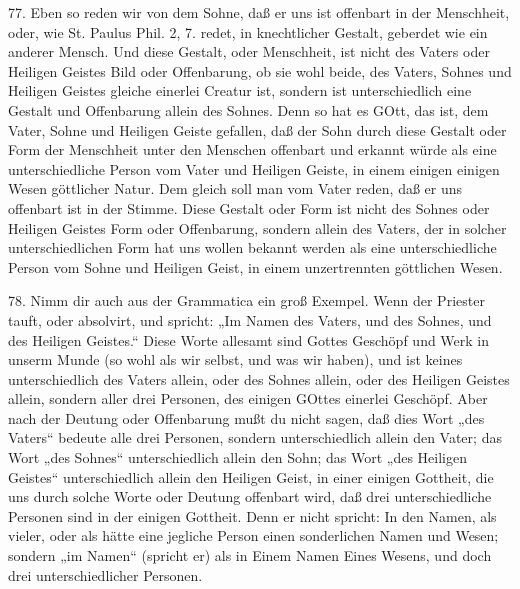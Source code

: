 77. Eben so reden wir von dem Sohne, daß er uns ist offenbart in der Menschheit, oder, wie St. Paulus Phil. 2, 7. redet, in knechtlicher Gestalt, geberdet wie ein anderer Mensch. Und diese Gestalt, oder Menschheit, ist nicht des Vaters oder Heiligen Geistes Bild oder Offenbarung, ob sie wohl beide, des Vaters, Sohnes und Heiligen Geistes gleiche einerlei Creatur ist, sondern ist unterschiedlich eine Gestalt und Offenbarung allein des Sohnes. Denn so hat es GOtt, das ist, dem Vater, Sohne und Heiligen Geiste gefallen, daß der Sohn durch diese Gestalt oder Form der Menschheit unter den Menschen offenbart und erkannt würde als eine unterschiedliche Person vom Vater und Heiligen Geiste, in einem einigen einigen Wesen göttlicher Natur. Dem gleich soll man vom Vater reden, daß er uns offenbart ist in der Stimme. Diese Gestalt oder Form ist nicht des Sohnes oder Heiligen Geistes Form oder Offenbarung, sondern allein des Vaters, der in solcher unterschiedlichen Form hat uns wollen bekannt werden als eine unterschiedliche Person vom Sohne und Heiligen Geist, in einem unzertrennten göttlichen Wesen.

78. Nimm dir auch aus der Grammatica ein groß Exempel. Wenn der Priester tauft, oder absolvirt, und spricht: „Im Namen des Vaters, und des Sohnes, und des Heiligen Geistes.“ Diese Worte allesamt sind Gottes Geschöpf und Werk in unserm Munde (so wohl als wir selbst, und was wir haben), und ist keines unterschiedlich des Vaters allein, oder des Sohnes allein, oder des Heiligen Geistes allein, sondern aller drei Personen, des einigen GOttes einerlei Geschöpf. Aber nach der Deutung oder Offenbarung mußt du nicht sagen, daß dies Wort „des Vaters“ bedeute alle drei Personen, sondern unterschiedlich allein den Vater; das Wort „des Sohnes“ unterschiedlich allein den Sohn; das Wort „des Heiligen Geistes“ unterschiedlich allein den Heiligen Geist, in einer einigen Gottheit, die uns durch solche Worte oder Deutung offenbart wird, daß drei unterschiedliche Personen sind in der einigen Gottheit. Denn er nicht spricht: In den Namen, als vieler, oder als hätte eine jegliche Person einen sonderlichen Namen und Wesen; sondern „im Namen“ (spricht er) als in Einem Namen Eines Wesens, und doch drei unterschiedlicher Personen.

